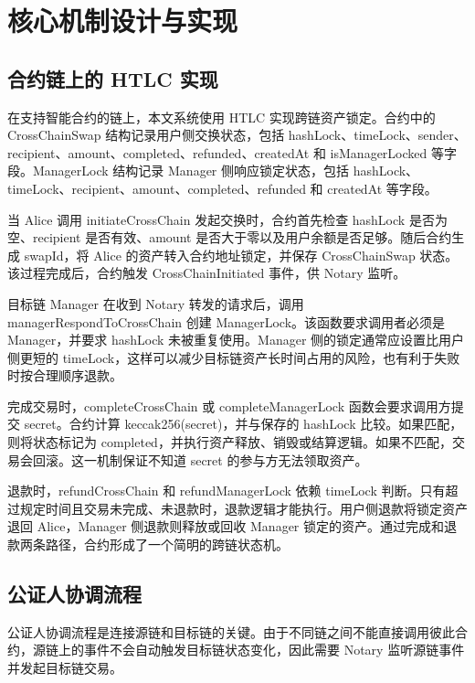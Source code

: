 
\chapter{核心机制设计与实现}


\section{合约链上的 HTLC 实现}


在支持智能合约的链上，本文系统使用 HTLC 实现跨链资产锁定。合约中的 CrossChainSwap 结构记录用户侧交换状态，包括 hashLock、timeLock、sender、recipient、amount、completed、refunded、createdAt 和 isManagerLocked 等字段。ManagerLock 结构记录 Manager 侧响应锁定状态，包括 hashLock、timeLock、recipient、amount、completed、refunded 和 createdAt 等字段。


当 Alice 调用 initiateCrossChain 发起交换时，合约首先检查 hashLock 是否为空、recipient 是否有效、amount 是否大于零以及用户余额是否足够。随后合约生成 swapId，将 Alice 的资产转入合约地址锁定，并保存 CrossChainSwap 状态。该过程完成后，合约触发 CrossChainInitiated 事件，供 Notary 监听。


目标链 Manager 在收到 Notary 转发的请求后，调用 managerRespondToCrossChain 创建 ManagerLock。该函数要求调用者必须是 Manager，并要求 hashLock 未被重复使用。Manager 侧的锁定通常应设置比用户侧更短的 timeLock，这样可以减少目标链资产长时间占用的风险，也有利于失败时按合理顺序退款。


完成交易时，completeCrossChain 或 completeManagerLock 函数会要求调用方提交 secret。合约计算 keccak256(secret)，并与保存的 hashLock 比较。如果匹配，则将状态标记为 completed，并执行资产释放、销毁或结算逻辑。如果不匹配，交易会回滚。这一机制保证不知道 secret 的参与方无法领取资产。


退款时，refundCrossChain 和 refundManagerLock 依赖 timeLock 判断。只有超过规定时间且交易未完成、未退款时，退款逻辑才能执行。用户侧退款将锁定资产退回 Alice，Manager 侧退款则释放或回收 Manager 锁定的资产。通过完成和退款两条路径，合约形成了一个简明的跨链状态机。


\section{公证人协调流程}


公证人协调流程是连接源链和目标链的关键。由于不同链之间不能直接调用彼此合约，源链上的事件不会自动触发目标链状态变化，因此需要 Notary 监听源链事件并发起目标链交易。


